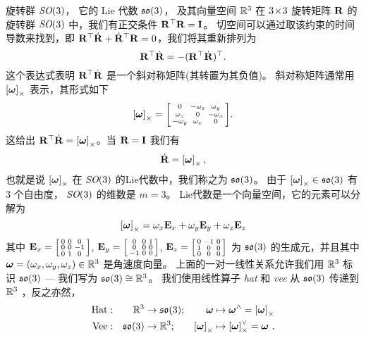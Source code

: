 
\begin{fexample}{旋转群 $\textit{SO}(3)$， 它的 Lie 代数 ${\mathfrak {so}}(3)$， 及其向量空间 ${\mathbb R}^3$}
\label{ex:SO3}
在 $3\!\times\!3$ 旋转矩阵 ${\bf R}$ 的旋转群 $\textit{SO}(3)$ 中，我们有正交条件 ${\bf R}^{\top}{\bf R}={\bf I}$。
切空间可以通过取该约束的时间导数来找到，即 ${\bf R}^{\top}\dot{{\bf R}}+\dot{{\bf R}}^{\top}{\bf R}=0$，我们将其重新排列为 $${\bf R}^{\top}\dot{{\bf R}}=-({\bf R}^{\top}\dot{{\bf R}})^{\top}.$$
这个表达式表明 ${\bf R}^{\top}\dot{{\bf R}}$ 是一个斜对称矩阵(其转置为其负值)。
斜对称矩阵通常用 $\left[{{\bm \omega}}\right]_\times$ 表示，其形式如下 
%
$$\left[{{\bm \omega}}\right]_\times=\begin{bsmallmatrix}
0 & -\omega_z & \omega_y \\
\omega_z & 0 & -\omega_x \\
-\omega_y & \omega_x & 0 
\end{bsmallmatrix}
.$$
%
这给出 ${\bf R}^{\top}\dot{{\bf R}}=\left[{{\bm \omega}}\right]_\times$。当 ${\bf R}={\bf I}$ 我们有 $$\dot{{\bf R}}=\left[{{\bm \omega}}\right]_\times,$$ 也就是说 $\left[{{\bm \omega}}\right]_\times$ 在 $\textit{SO}(3)$ 的Lie代数中，我们称之为 ${\mathfrak {so}}(3)$。
%
由于 $\left[{{\bm \omega}}\right]_\times\in{\mathfrak {so}}(3)$ 有 $3$ 个自由度， $\textit{SO}(3)$ 的维数是 $m=3$。
Lie代数是一个向量空间，它的元素可以分解为
%
$$
\left[{{\bm \omega}}\right]_\times = 
  \omega_x{\bf E}_x+
  \omega_y{\bf E}_y+
  \omega_z{\bf E}_z
$$
其中  
$
{\bf E}_x=
\begin{bsmallmatrix}0&0&0\\0&0&-1\\0&1&0\end{bsmallmatrix}$, 
${\bf E}_y=
\begin{bsmallmatrix}0&0&1\\0&0&0\\-1&0&0\end{bsmallmatrix}$,
 ${\bf E}_z=
\begin{bsmallmatrix}0&-1&0\\1&0&0\\0&0&0\end{bsmallmatrix}$ 
为 ${\mathfrak {so}}(3)$ 的生成元，并且其中 ${{\bm \omega}}=(\omega_x,\omega_y,\omega_z)\in{\mathbb R}^3$ 是角速度向量。 
%
上面的一对一线性关系允许我们用 ${\mathbb R}^3$ 标识 ${\mathfrak {so}}(3)$ --- 我们写为 ${\mathfrak {so}}(3)\cong{\mathbb R}^3$。
我们使用线性算子 \emph{hat} 和 \emph{vee} 从 ${\mathfrak {so}}(3)$ 传递到 ${\mathbb R}^3$ ，反之亦然，
%
\begin{align*}
\textrm{Hat}&:& {\mathbb R}^3&\to{\mathfrak {so}}(3);& {{\bm \omega}}&\mapsto{{\bm \omega}}^\wedge=\left[{{\bm \omega}}\right]_\times 
\\
\textrm{Vee}&:& {\mathfrak {so}}(3)&\to{\mathbb R}^3;& \left[{{\bm \omega}}\right]_\times&\mapsto\left[{{\bm \omega}}\right]_\times^\vee={{\bm \omega}}
~.
\end{align*}
\end{fexample}
